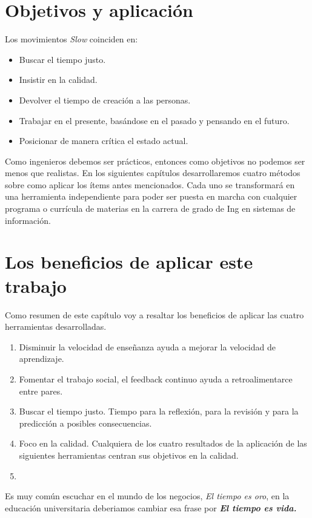 \section{Objetivos y aplicaci\'on}
Los movimientos \textit{Slow} coinciden en:
\begin{itemize}
 \item Buscar el tiempo justo.
 \item Insistir en la calidad.
 \item Devolver el tiempo de creaci\'on a las personas.
 \item Trabajar en el presente, bas\'andose en el pasado y pensando en el futuro.
 \item Posicionar de manera cr\'itica el estado actual.
\end{itemize}
Como ingenieros debemos ser pr\'acticos, entonces como objetivos no podemos ser menos que realistas. En los siguientes cap\'itulos desarrollaremos cuatro m\'etodos
sobre como aplicar los \'items antes mencionados. Cada uno se transformar\'a en una herramienta independiente para poder ser puesta en marcha con cualquier 
programa o curr\'icula de materias en la carrera de grado de Ing en sistemas de informaci\'on.\\


\section{Los beneficios de aplicar este trabajo}
Como resumen de este cap\'itulo voy a resaltar los beneficios de aplicar las cuatro herramientas desarrolladas.
\begin{enumerate}
 \item Disminuir la velocidad de ense\~nanza ayuda a mejorar la velocidad de aprendizaje.
 \item Fomentar el trabajo social, el feedback continuo ayuda a retroalimentarce entre pares.
 \item Buscar el tiempo justo. Tiempo para la reflexi\'on, para la revisi\'on y para la predicci\'on a posibles consecuencias.
 \item Foco en la calidad. Cualquiera de los cuatro resultados de la aplicaci\'on de las siguientes herramientas centran sus objetivos en la calidad.
 \item 
\end{enumerate}
Es muy com\'un escuchar en el mundo de los negocios, \textit{El tiempo es oro}, en la educaci\'on universitaria deberiamos cambiar esa frase por 
\textit{\textbf{El tiempo es vida.}}




